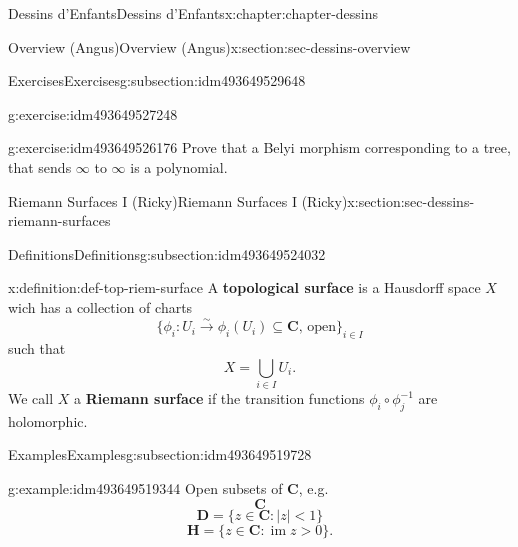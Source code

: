 \documentclass[oneside,10pt,]{book}
\newcommand{\terminology}[1]{\textbf{#1}}
\numberwithin{equation}{section}
\newcommand{\CC}{\mathbf{C}}
\newcommand{\HH}{\mathbf{H}}
\DeclareMathOperator{\im}{im}
\newcommand{\lt}{<}
\newcommand{\gt}{>}
\begin{document}
\begin{chapterptx}{Dessins d'Enfants}{}{Dessins d'Enfants}{}{}{x:chapter:chapter-dessins}
\begin{sectionptx}{Overview (Angus)}{}{Overview (Angus)}{}{}{x:section:sec-dessins-overview}
\begin{subsectionptx}{Exercises}{}{Exercises}{}{}{g:subsection:idm493649529648}
\begin{inlineexercise}{}{g:exercise:idm493649527248}
\end{inlineexercise}
\begin{inlineexercise}{}{g:exercise:idm493649526176}%
Prove that a Belyi morphism corresponding to a tree, that sends \(\infty\) to \(\infty\) is a polynomial.%
\end{inlineexercise}
\end{subsectionptx}
\end{sectionptx}
%
%
\typeout{************************************************}
\typeout{************************************************}
%
\begin{sectionptx}{Riemann Surfaces I (Ricky)}{}{Riemann Surfaces I (Ricky)}{}{}{x:section:sec-dessins-riemann-surfaces}
%
%
\typeout{************************************************}
\typeout{************************************************}
%
\begin{subsectionptx}{Definitions}{}{Definitions}{}{}{g:subsection:idm493649524032}
\begin{definition}{}{x:definition:def-top-riem-surface}%
A \terminology{topological surface} is a Hausdorff space \(X\) wich has a collection of charts%
\begin{equation*}
\{\phi_i \colon U_i \xrightarrow\sim \phi_i(U_i) \subseteq \CC,\,\text{open}\}_{i\in I}
\end{equation*}
such that%
\begin{equation*}
X= \bigcup_{i\in I} U_i\text{.}
\end{equation*}
We call \(X\) a \terminology{Riemann surface} if the transition functions \(\phi_i\circ \phi_j^{-1}\) are holomorphic.%
\end{definition}
\end{subsectionptx}
%
%
\typeout{************************************************}
\typeout{************************************************}
%
\begin{subsectionptx}{Examples}{}{Examples}{}{}{g:subsection:idm493649519728}
\begin{example}{}{g:example:idm493649519344}%
Open subsets of \(\CC\), e.g.%
\begin{equation*}
\CC
\end{equation*}
%
\begin{equation*}
\mathbf D = \{z\in \CC : |z| \lt 1 \}
\end{equation*}
%
\begin{equation*}
\HH = \{z\in \CC : \im z \gt 0 \}\text{.}

\end{equation*}
\end{example}
\end{subsectionptx}
\end{sectionptx}
\end{chapterptx}
\end{document}
